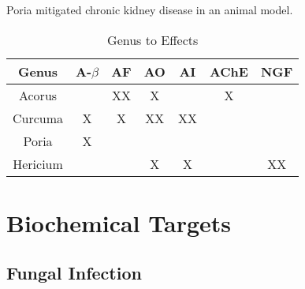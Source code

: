 \documentclass[twocolumn]{article}
\begin{document}
Poria mitigated chronic kidney disease in an animal model.
\cite{zhao2013urinary}







\begin{table*}[htp]
\centering

\begin{tabular}{||c c c c c c c||}
 \hline
 Genus          & A-$\beta$ & AF & AO & AI & AChE & NGF \\
 \hline\hline
 Acorus         &           & XX &  X &    &   X  &     \\
 Curcuma        &     X     & X  & XX & XX &      &     \\
 Poria          &     X     &    &    &    &      &     \\
 Hericium       &           &    &  X &  X &      &  XX \\
 \hline
\end{tabular}
\caption{Genus to Effects}
\label{table:effects}
\end{table*}



























\section{Biochemical Targets}


\subsection{Fungal Infection}
\end{document}
